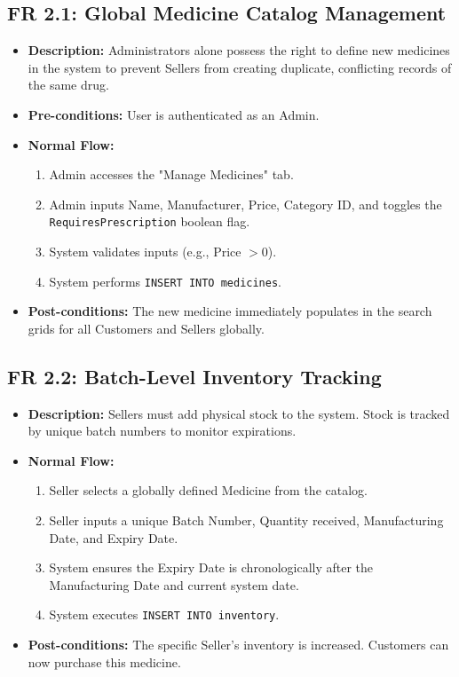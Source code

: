 \documentclass[12pt,a4paper]{report}
\begin{document}
\subsection{FR 2.1: Global Medicine Catalog Management}
\begin{itemize}
    \item \textbf{Description:} Administrators alone possess the right to define new medicines in the system to prevent Sellers from creating duplicate, conflicting records of the same drug.
    \item \textbf{Pre-conditions:} User is authenticated as an Admin.
    \item \textbf{Normal Flow:}
        \begin{enumerate}
            \item Admin accesses the "Manage Medicines" tab.
            \item Admin inputs Name, Manufacturer, Price, Category ID, and toggles the \texttt{RequiresPrescription} boolean flag.
            \item System validates inputs (e.g., Price $> 0$).
            \item System performs \texttt{INSERT INTO medicines}.
        \end{enumerate}
    \item \textbf{Post-conditions:} The new medicine immediately populates in the search grids for all Customers and Sellers globally.
\end{itemize}

\subsection{FR 2.2: Batch-Level Inventory Tracking}
\begin{itemize}
    \item \textbf{Description:} Sellers must add physical stock to the system. Stock is tracked by unique batch numbers to monitor expirations.
    \item \textbf{Normal Flow:}
        \begin{enumerate}
            \item Seller selects a globally defined Medicine from the catalog.
            \item Seller inputs a unique Batch Number, Quantity received, Manufacturing Date, and Expiry Date.
            \item System ensures the Expiry Date is chronologically after the Manufacturing Date and current system date.
            \item System executes \texttt{INSERT INTO inventory}.
        \end{enumerate}
    \item \textbf{Post-conditions:} The specific Seller's inventory is increased. Customers can now purchase this medicine.
\end{itemize}
\end{document}
